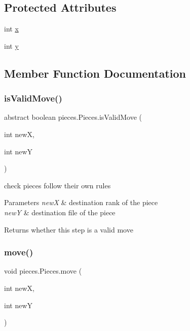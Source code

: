 \subsection*{Protected Attributes}
\begin{DoxyCompactItemize}
\item 
int \mbox{\hyperlink{classpieces_1_1_pieces_ac5178f9b8a6b0c4235851475081249f3}{x}}
\item 
int \mbox{\hyperlink{classpieces_1_1_pieces_a66d911734967a8ced1b9792fe900fadb}{y}}
\end{DoxyCompactItemize}


\subsection{Member Function Documentation}
\mbox{\label{classpieces_1_1_pieces_a4bdbd9bc2aa556e230e71a0cf756228f}} 
\subsubsection{\texorpdfstring{is\+Valid\+Move()}{isValidMove()}}
{\footnotesize\ttfamily abstract boolean pieces.\+Pieces.\+is\+Valid\+Move (\begin{DoxyParamCaption}\item[{int}]{newX,  }\item[{int}]{newY }\end{DoxyParamCaption})\hspace{0.3cm}{\ttfamily [abstract]}}

check pieces follow their own rules 
\begin{DoxyParams}{Parameters}
{\em newX} & destination rank of the piece \\
\hline
{\em newY} & destination file of the piece \\
\hline
\end{DoxyParams}
\begin{DoxyReturn}{Returns}
whether this step is a valid move 
\end{DoxyReturn}
\mbox{\label{classpieces_1_1_pieces_aa204ec32ed62d79896561f253caf663a}} 
\subsubsection{\texorpdfstring{move()}{move()}}
{\footnotesize\ttfamily void pieces.\+Pieces.\+move (\begin{DoxyParamCaption}\item[{int}]{newX,  }\item[{int}]{newY }\end{DoxyParamCaption})\hspace{0.3cm}{\ttfamily [inline]}}

